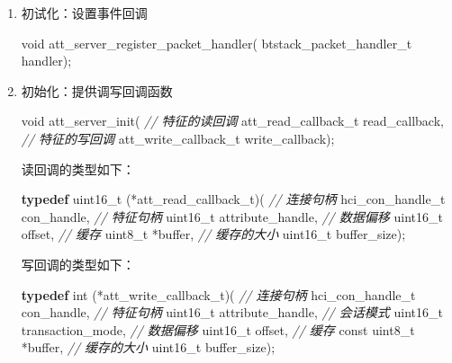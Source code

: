 \documentclass[
  12pt,
]{book}
\newenvironment{Shaded}{\begin{snugshade}}{\end{snugshade}}
\newcommand{\CommentTok}[1]{\textcolor[rgb]{0.56,0.35,0.01}{\textit{#1}}}
\newcommand{\DataTypeTok}[1]{\textcolor[rgb]{0.13,0.29,0.53}{#1}}
\newcommand{\KeywordTok}[1]{\textcolor[rgb]{0.13,0.29,0.53}{\textbf{#1}}}
\newcommand{\NormalTok}[1]{#1}
\begin{document}
\begin{enumerate}
\def\labelenumi{\arabic{enumi}.}
\item
  初试化：设置事件回调

\begin{Shaded}
\begin{Highlighting}[]
\DataTypeTok{void}\NormalTok{ att_server_register_packet_handler(}
\NormalTok{  btstack_packet_handler_t handler);}
\end{Highlighting}
\end{Shaded}
\item
  初始化：提供调写回调函数

\begin{Shaded}
\begin{Highlighting}[]
\DataTypeTok{void}\NormalTok{ att_server_init(}
  \CommentTok{// 特征的读回调}
\NormalTok{  att_read_callback_t read_callback,}
  \CommentTok{// 特征的写回调}
\NormalTok{  att_write_callback_t write_callback);}
\end{Highlighting}
\end{Shaded}

  读回调的类型如下：

\begin{Shaded}
\begin{Highlighting}[]
\KeywordTok{typedef} \DataTypeTok{uint16_t}\NormalTok{ (*att_read_callback_t)(}
  \CommentTok{// 连接句柄}
\NormalTok{  hci_con_handle_t con_handle,}
  \CommentTok{// 特征句柄}
  \DataTypeTok{uint16_t}\NormalTok{ attribute_handle,}
  \CommentTok{// 数据偏移}
  \DataTypeTok{uint16_t}\NormalTok{ offset,}
  \CommentTok{// 缓存}
  \DataTypeTok{uint8_t}\NormalTok{ *buffer,}
  \CommentTok{// 缓存的大小}
  \DataTypeTok{uint16_t}\NormalTok{ buffer_size);}
\end{Highlighting}
\end{Shaded}

  写回调的类型如下：

\begin{Shaded}
\begin{Highlighting}[]
\KeywordTok{typedef} \DataTypeTok{int}\NormalTok{ (*att_write_callback_t)(}
  \CommentTok{// 连接句柄}
\NormalTok{  hci_con_handle_t con_handle,}
  \CommentTok{// 特征句柄}
  \DataTypeTok{uint16_t}\NormalTok{ attribute_handle,}
  \CommentTok{// 会话模式}
  \DataTypeTok{uint16_t}\NormalTok{ transaction_mode,}
  \CommentTok{// 数据偏移}
  \DataTypeTok{uint16_t}\NormalTok{ offset,}
  \CommentTok{// 缓存}
  \DataTypeTok{const} \DataTypeTok{uint8_t}\NormalTok{ *buffer,}
  \CommentTok{// 缓存的大小}
  \DataTypeTok{uint16_t}\NormalTok{ buffer_size);}
\end{Highlighting}
\end{Shaded}


\end{enumerate}
\end{document}
